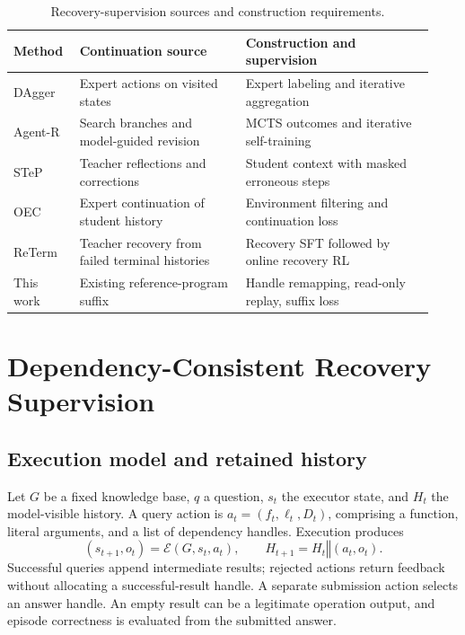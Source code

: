 \documentclass[runningheads]{llncs}
\begin{document}
\begin{table}[htbp]
 \centering
 \caption{Recovery-supervision sources and construction requirements.}
 \label{tab:related}
 \begin{tabular}{@{}p{0.14\linewidth}p{0.37\linewidth}p{0.42\linewidth}@{}}
\toprule
Method & Continuation source & Construction and supervision \\
\midrule
DAgger & Expert actions on visited states & Expert labeling and iterative aggregation \\
Agent-R & Search branches and model-guided revision & MCTS outcomes and iterative self-training \\
STeP & Teacher reflections and corrections & Student context with masked erroneous steps \\
OEC & Expert continuation of student history & Environment filtering and continuation loss \\
ReTerm & Teacher recovery from failed terminal histories & Recovery SFT followed by online recovery RL \\
This work & Existing reference-program suffix & Handle remapping, read-only replay, suffix loss \\
\bottomrule
\end{tabular}
\end{table}

\section{Dependency-Consistent Recovery Supervision}

\subsection{Execution model and retained history}

Let $G$ be a fixed knowledge base, $q$ a question, $s_t$ the executor state, and $H_t$ the model-visible history. A query action is $a_t=(f_t,\ell_t,D_t)$, comprising a function, literal arguments, and a list of dependency handles. Execution produces
\begin{equation}
 (s_{t+1},o_t)=\mathcal{E}(G,s_t,a_t),\qquad
 H_{t+1}=H_t\mathbin{\Vert}(a_t,o_t).
\end{equation}
Successful queries append intermediate results; rejected actions return feedback without allocating a successful-result handle. A separate submission action selects an answer handle. An empty result can be a legitimate operation output, and episode correctness is evaluated from the submitted answer.
\end{document}
